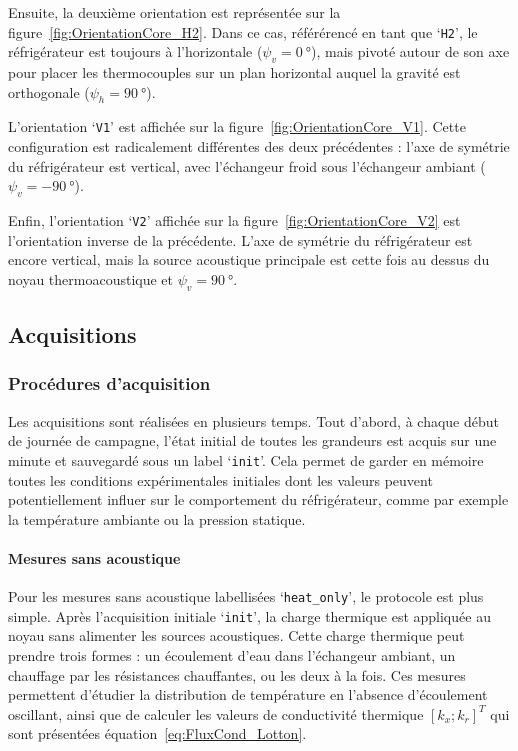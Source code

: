 Ensuite, la deuxième orientation est représentée sur la figure~\ref{fig:OrientationCore_H2}. Dans ce cas, référérencé en tant que `\texttt{H2}', le réfrigérateur est toujours à l'horizontale ($\psi_v=\qty{0}{\degree}$), mais pivoté autour de son axe pour placer les thermocouples sur un plan horizontal auquel la gravité est orthogonale ($\psi_h=\qty{90}{\degree}$).
\smallskip

L'orientation `\texttt{V1}' est affichée sur la figure~\ref{fig:OrientationCore_V1}. Cette configuration est radicalement différentes des deux précédentes : l'axe de symétrie du réfrigérateur est vertical, avec l'échangeur froid sous l'échangeur ambiant ($\psi_v=\qty{-90}{\degree}$).

Enfin, l'orientation `\texttt{V2}' affichée sur la figure~\ref{fig:OrientationCore_V2} est l'orientation inverse de la précédente. L'axe de symétrie du réfrigérateur est encore vertical, mais la source acoustique principale est cette fois au dessus du noyau thermoacoustique et $\psi_v=\qty{+90}{\degree}$.

\subsection{Acquisitions}
\subsubsection{Procédures d'acquisition}
Les acquisitions sont réalisées en plusieurs temps. Tout d'abord, à chaque début de journée de campagne, l'état initial de toutes les grandeurs est acquis sur une minute et sauvegardé sous un label `\texttt{init}'. Cela permet de garder en mémoire toutes les conditions expérimentales initiales dont les valeurs peuvent potentiellement influer sur le comportement du réfrigérateur, comme par exemple la température ambiante ou la pression statique. 

\paragraph{Mesures sans acoustique}
Pour les mesures sans acoustique labellisées `\texttt{heat\_{}only}', le protocole est plus simple. Après l'acquisition initiale `\texttt{init}', la charge thermique est appliquée au noyau sans alimenter les sources acoustiques. Cette charge thermique peut prendre trois formes : un écoulement d'eau dans l'échangeur ambiant, un chauffage par les résistances chauffantes, ou les deux à la fois. Ces mesures permettent d'étudier la distribution de température en l'absence d'écoulement oscillant, ainsi que de calculer les valeurs de conductivité thermique $[k_x;k_r]^T$ qui sont présentées équation~\eqref{eq:FluxCond_Lotton}.

